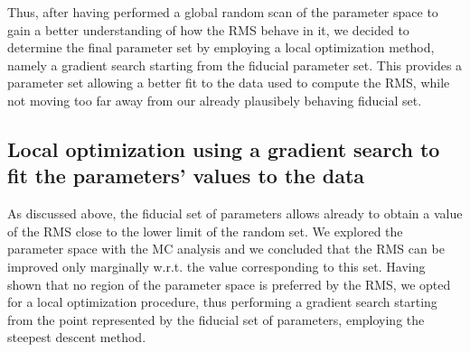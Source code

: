 \documentclass[oneside, 10pt, a4paper, twocolumn]{article}
\begin{document}
Thus, after having performed a global random scan of the parameter space to gain a better understanding of how the RMS behave in it, we decided to determine the final parameter set by employing a local optimization method, namely a gradient search starting from the fiducial parameter set. 
This provides a parameter set allowing a better fit to the data used to compute the RMS, while not moving too far away from our already plausibely behaving fiducial set. 






\subsection{Local optimization using a gradient search to fit the parameters' values to the data}

As discussed above, the fiducial set of parameters allows already to obtain a value of the RMS close to the lower limit of the random set. We explored the parameter space with the MC analysis and we concluded that the RMS can be improved only marginally w.r.t. the value corresponding to this set. %
Having shown that no region of the parameter space is preferred by the RMS, we opted for a local optimization procedure, thus performing a gradient search starting from the point represented by the fiducial set of parameters, 
employing the steepest descent method. 
\end{document}
